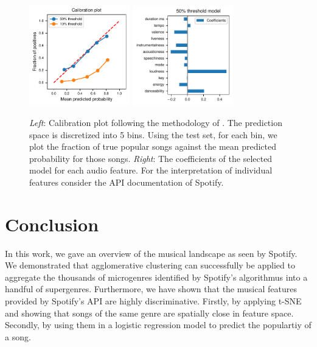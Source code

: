 \documentclass{article}
\begin{document}
\begin{figure}
  \centering
  \includegraphics[width=0.39\textwidth]{../figures/calibration_combined.pdf}
  \qquad
  \includegraphics[width=0.39\textwidth]{../figures/logistic_coefs_50_threshold_model.pdf}
  \caption{\textit{Left}: Calibration plot following the methodology of \cite{niculescu-mizilPredictingGoodProbabilities2005}. The prediction space is discretized into 5 bins. Using the test set, for each bin, we plot the fraction of true popular songs against the mean predicted probability for those songs. \textit{Right}: The coefficients of the selected model for each audio feature. For the interpretation of individual features consider the API documentation of Spotify.}
  \label{fig:logis_eval}
\end{figure}

  

\section{Conclusion}

In this work, we gave an overview of the musical landscape as seen by Spotify. We demonstrated that agglomerative clustering can successfully be applied to aggregate the thousands of microgenres identified by Spotify's algorithmus into a handful of supergenres. Furthermore, we have shown that the musical features provided by Spotify's API are highly discriminative. Firstly, by applying t-SNE and showing that songs of the same genre are spatially close in  feature space. Secondly, by using them in a logistic regression model to predict the populartiy of a song.
\end{document}
